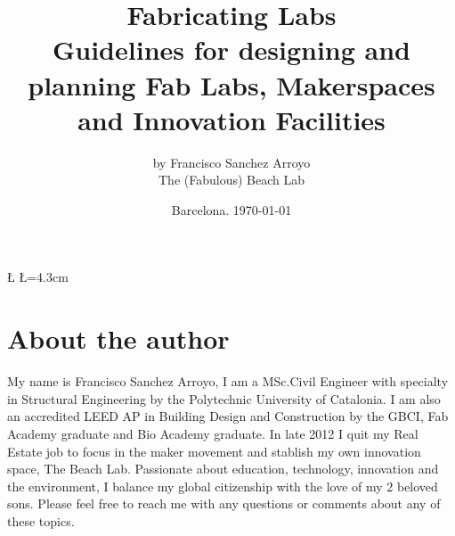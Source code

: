 \documentclass[a4paper,12pt,titlepage]{article}
\title{Fabricating Labs\\
\Huge \textbf{Guidelines for designing and planning Fab Labs, Makerspaces and Innovation Facilities}}
\author{
by Francisco Sanchez Arroyo\\
The (Fabulous) Beach Lab
}
\date{Barcelona. \today}
\begin{document}

\newcommand{\D}{6} %
\newcommand{\U}{5} %

\newdimen\R %
\R=3.5cm 
\newdimen\L %
\L=4.3cm


\newcommand{\A}{360/\D} %

\maketitle

\tableofcontents %
\clearpage






\pagestyle{fancy}

\section*{About the author}
My name is Francisco Sanchez Arroyo, I am a MSc.Civil Engineer with specialty in Structural Engineering by the Polytechnic University of Catalonia. I am also an accredited LEED AP in Building Design and Construction by the GBCI, Fab Academy graduate and Bio Academy graduate. In late 2012 I quit my Real Estate job to focus in the maker movement and stablish my own innovation space, The Beach Lab. Passionate about education, technology, innovation and the environment, I balance my global citizenship with the love of my 2 beloved sons. Please feel free to reach me with any questions or comments about any of these topics.\\

\\
\\
\end{document}
